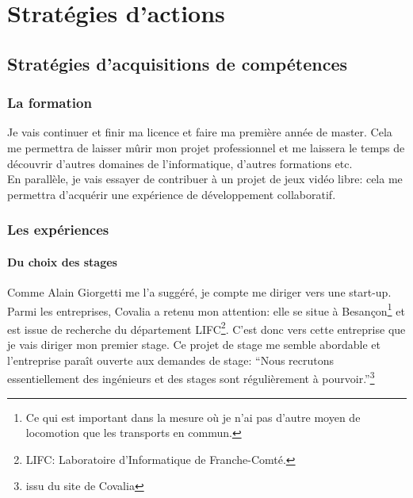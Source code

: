 \documentclass[a4paper,12pt, draft]{report}
\begin{document}
\part{Stratégies d'actions}

\chapter{Stratégies d'acquisitions de compétences}
\section{La formation}
Je vais continuer et finir ma licence et faire ma première année de master.
Cela me permettra de laisser mûrir mon projet professionnel et me laissera le temps de découvrir d'autres domaines de l'informatique, d'autres formations etc.\\
En parallèle, je vais essayer de contribuer à un projet de jeux vidéo libre: cela me permettra d'acquérir une expérience de développement collaboratif.
\section{Les expériences}
\subsection{Du choix des stages}
Comme Alain Giorgetti me l'a suggéré, je compte me diriger vers une start-up.
Parmi les entreprises, Covalia a retenu mon attention: elle se situe à Besançon\footnote{Ce qui est important dans la mesure où je n'ai pas d'autre moyen de locomotion que les transports en commun.} et est issue de recherche du département LIFC\footnote{\textsc{LIFC}: Laboratoire d'Informatique de Franche-Comté.}. C'est donc vers cette entreprise que je vais diriger mon premier stage.
Ce projet de stage me semble abordable et l'entreprise paraît ouverte aux demandes de stage: ``Nous recrutons essentiellement des ingénieurs et des stages sont régulièrement à pourvoir.''\footnote{issu du site de Covalia}
\end{document}

